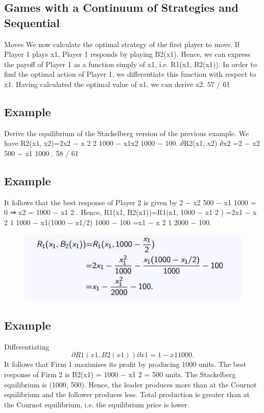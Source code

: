 \documentclass[]{report}
\begin{document}
\subsection{Games with a Continuum of Strategies and Sequential}
Moves
We now calculate the optimal strategy of the first player to move.
If Player 1 plays x1, Player 1 responds by playing B2(x1). Hence,
we can express the payoff of Player 1 as a function simply of x1,
i.e. R1(x1, B2(x1)).
In order to find the optimal action of Player 1, we differentiate this
function with respect to x1.
Having calculated the optimal value of x1, we can derive x2.
57 / 61
\subsection{Example}
Derive the equilibrium of the Stackelberg version of the previous
example.
We have
R2(x1, x2)=2x2 −
x
2
2
1000
−
x1x2
1000
− 100.
∂R2(x1, x2)
∂x2
=2 −
x2
500
−
x1
1000
.
58 / 61
\subsection{Example}
It follows that the best response of Player 2 is given by
2 −
x2
500
−
x1
1000
= 0 ⇒ x2 = 1000 −
x1
2
.
Hence,
R1(x1, B2(x1))=R1(x1, 1000 −
x1
2
)
=2x1 −
x
2
1
1000
−
x1(1000 − x1/2)
1000
− 100
=x1 −
x
2
1
2000
− 100.

\begin{figure}[h!]
\centering
\includegraphics[width=0.7\linewidth]{images/DR6-Slide59}
\caption{}
\label{fig:DR6-Slide59}
\end{figure}

\subsection{Example}
Differentiating
\[∂R1(x1, B2(x1))
∂x1
= 1 −
x1
1000
.\]
It follows that Firm 1 maximises its profit by producing 1000 units.
The best response of Firm 2 is B2(x1) = 1000 −
x1
2 = 500 units.
The Stackelberg equilibrium is (1000, 500). Hence, the leader
produces more than at the Cournot equilibrium and the follower
produces less.
Total production is greater than at the Cournot equilibrium, i.e.
the equilibrium price is lower.
\end{document}
